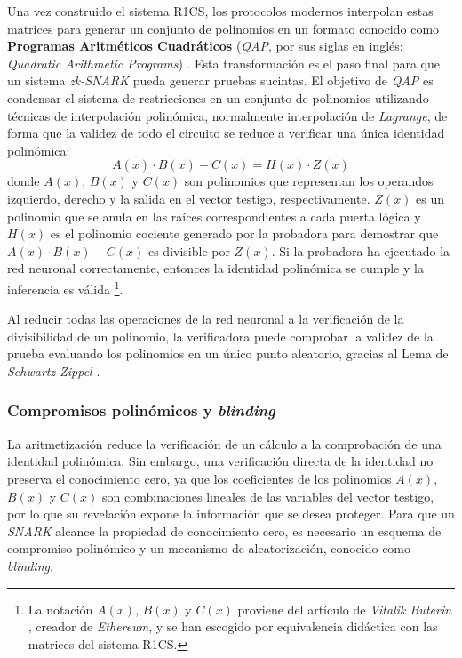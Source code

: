 \documentclass[a4paper, 11pt]{article}
\begin{document}
Una vez construido el sistema R1CS, los protocolos modernos interpolan estas matrices para generar un
conjunto de polinomios en un formato conocido como \textbf{Programas Aritméticos Cuadráticos}
(\textit{QAP}, por sus siglas en inglés: \textit{Quadratic Arithmetic Programs}) \cite{gennaro2013quadratic}.
Esta transformación es el paso final para que un sistema \textit{zk-SNARK} pueda generar pruebas
sucintas. El objetivo de \textit{QAP} es condensar el sistema de restricciones en un conjunto de
polinomios utilizando técnicas de interpolación polinómica, normalmente interpolación de
\textit{Lagrange}, de forma que la validez de todo el circuito se reduce a verificar una única
identidad polinómica:
\begin{equation}
  A(x) \cdot B(x) - C(x) = H(x) \cdot Z(x) \label{qap}
\end{equation}
donde $A(x)$, $B(x)$ y $C(x)$ son polinomios que representan los operandos izquierdo, derecho y la
salida en el vector testigo, respectivamente. $Z(x)$ es un polinomio que se anula en las raíces
correspondientes a cada puerta lógica y $H(x)$ es el polinomio cociente generado por la probadora
para demostrar que $A(x) \cdot B(x) - C(x)$ es divisible por $Z(x)$. Si la probadora ha ejecutado la
red neuronal correctamente, entonces la identidad polinómica se cumple y la inferencia es válida
\footnote{La notación $A(x)$, $B(x)$ y $C(x)$ proviene del artículo de \textit{Vitalik Buterin}
  \cite{buterin2016qap}, creador de \textit{Ethereum}, y se han escogido por equivalencia didáctica
  con las matrices del sistema R1CS.}.

Al reducir todas las operaciones de la red neuronal a la verificación de la divisibilidad de un
polinomio, la verificadora puede comprobar la validez de la prueba evaluando los polinomios en un
único punto aleatorio, gracias al Lema de \textit{Schwartz-Zippel} \cite[Capítulo~4]{thaler2022proofs}.

\subsubsection{Compromisos polinómicos y \textit{blinding}} \label{compromisos_blinding}

La aritmetización reduce la verificación de un cálculo a la comprobación de una identidad polinómica.
Sin embargo, una verificación directa de la identidad no preserva el conocimiento cero, ya que los
coeficientes de los polinomios $A(x)$, $B(x)$ y $C(x)$ son combinaciones lineales de las variables
del vector testigo, por lo que su revelación expone la información que se desea proteger. Para que
un \textit{SNARK} alcance la propiedad de conocimiento cero, es necesario un esquema de compromiso
polinómico y un mecanismo de aleatorización, conocido como \textit{blinding}.
\end{document}
